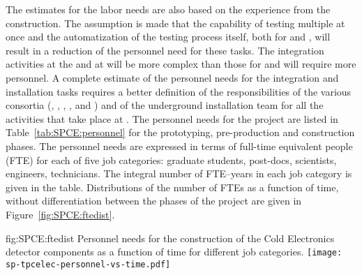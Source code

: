 The estimates for the labor needs are also based on the
experience from the  construction. The assumption
is made that the capability of testing multiple 
at once and the automatization of the testing process itself,
both for  and , will result in
a reduction of the personnel need for these tasks. The
integration activities at the  and at \surf
will be more complex than those for  and
will require more personnel. A complete estimate of the
personnel needs for the integration and installation tasks
requires a better definition of the responsibilities of
the various consortia (, , ,
, and ) and of the underground
installation team for all the activities that take place
at \surf. The personnel needs for the project are listed in
Table~\ref{tab:SPCE:personnel} for the prototyping,
pre-production and construction phases. The personnel
needs are expressed in terms of full-time equivalent
people (FTE) for each of five job categories: graduate students,
post-docs, scientists, engineers, technicians. The
integral number of FTE--years in each job category is given
in the table. Distributions of the number of FTEs as
a function of time, without differentiation between the
phases of the project are given in Figure~\ref{fig:SPCE:ftedist}.

\begin{dunefigure}
{fig:SPCE:ftedist}
{Personnel needs for the construction of the Cold Electronics detector components 
as a function of time for different job categories.}
\texttt{[image: sp-tpcelec-personnel-vs-time.pdf]}
\end{dunefigure}

